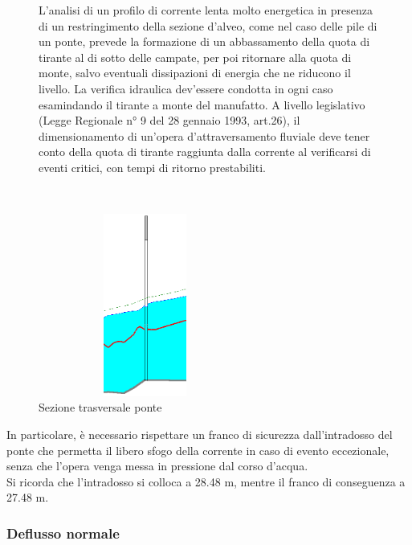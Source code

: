 \documentclass[12pt]{article} %
\begin{document}
\begin{figure}[H]
\begin{minipage}[b]{8.5cm}
L'analisi di un profilo di corrente lenta molto energetica in presenza di un restringimento della sezione d'alveo, come nel caso delle pile di un ponte, prevede la formazione di un abbassamento della quota di tirante al di sotto delle campate, per poi ritornare alla quota di monte, salvo eventuali dissipazioni di energia che ne riducono il livello. La verifica idraulica dev'essere condotta in ogni caso esamindando il tirante a monte del manufatto. A livello legislativo (Legge Regionale n° 9 del 28 gennaio 1993, art.26), il dimensionamento di un'opera d'attraversamento fluviale deve tener conto della quota di tirante raggiunta dalla corrente al verificarsi di eventi critici, con tempi di ritorno prestabiliti.

\end{minipage}
\ \hspace{2mm} \hspace{3mm} \
\begin{minipage}[b]{8.5cm}
    \centering
    \includegraphics[height=6cm, width=7cm]{Restringimento.PNG}
    \caption{Sezione trasversale ponte}
\end{minipage}
\end{figure}
 
\noindent
 In particolare, è necessario rispettare un franco di sicurezza dall'intradosso del ponte che permetta il libero sfogo della corrente in caso di evento eccezionale, senza che l'opera venga messa in pressione dal corso d'acqua.\\
\noindent Si ricorda che l'intradosso si colloca a 28.48 m, mentre il franco di conseguenza a 27.48 m.

\subsubsection{Deflusso normale}
\end{document}
